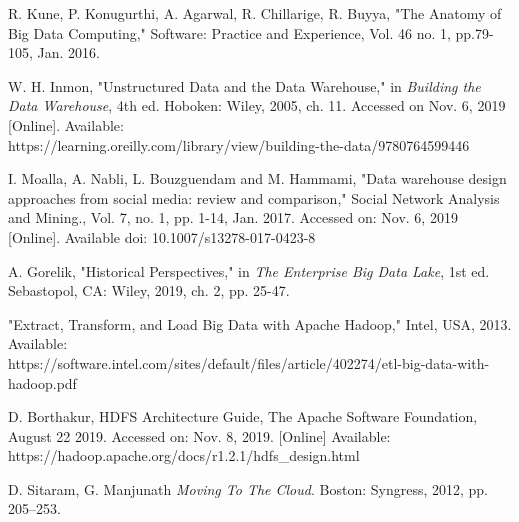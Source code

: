 \documentclass[journal]{IEEEtran}
\begin{document}
\ifCLASSOPTIONcaptionsoff
  \newpage
\fi

\begin{thebibliography}{1}

R. Kune, P. Konugurthi, A. Agarwal, R. Chillarige, R. Buyya,
 "The Anatomy of Big Data Computing," Software: Practice and Experience,
 Vol. 46 no. 1, pp.79-105, Jan. 2016. 

W. H. Inmon, "Unstructured Data and the Data Warehouse," in 
  \emph{Building the Data Warehouse},
  4th ed. Hoboken: Wiley, 2005, ch. 11.
  Accessed on Nov. 6, 2019 [Online]. 
  Available: \\ https://learning.oreilly.com/library/view/building-the-data/9780764599446

I. Moalla, A. Nabli, L. Bouzguendam and M. Hammami,
 "Data warehouse design approaches from social media: review and comparison,"
 Social Network Analysis and Mining., Vol. 7, no. 1, pp. 1-14, Jan. 2017.
 Accessed on: Nov. 6, 2019 [Online]. 
 Available doi: 10.1007/s13278-017-0423-8

A. Gorelik, "Historical Perspectives," in 
 \emph{The Enterprise Big Data Lake},
 1st ed. Sebastopol, CA: Wiley, 2019, ch. 2, pp. 25-47.

"Extract, Transform, and Load Big Data with Apache Hadoop," Intel, USA, 2013.
 Available:\\ https://software.intel.com/sites/default/files/article/402274/etl-big-data-with-hadoop.pdf

D. Borthakur, HDFS Architecture Guide, The Apache Software Foundation,
 August 22 2019. Accessed on: Nov. 8, 2019. [Online] Available: \\
 https://hadoop.apache.org/docs/r1.2.1/hdfs\_design.html

D. Sitaram, G. Manjunath \textit{Moving To The Cloud}. Boston: Syngress, 2012, pp. 205–253.


\end{thebibliography}


\end{document}
